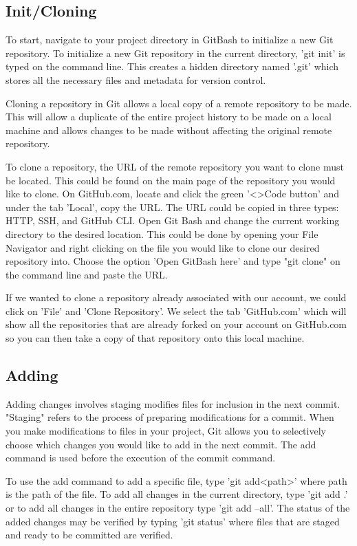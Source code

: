 \documentclass[10pt,twocolumn]{article}
\begin{document}
\subsection{Init/Cloning}

To start, navigate to your project directory in GitBash to initialize a new Git repository. To initialize a new Git repository in the current directory, 'git init' is typed on the command line. This creates a hidden directory named '.git' which stores all the necessary files and metadata for version control.  

Cloning a repository in Git allows a local copy of a remote repository to be made. This will allow a duplicate of the entire project history to be made on a local machine and allows changes to be made without affecting the original remote repository. 

To clone a repository, the URL of the remote repository you want to clone must be located. This could be found on the main page of the repository you would like to clone. On GitHub.com, locate and click the green '<>Code button' and under the tab 'Local', copy the URL. The URL could be copied in three types: HTTP, SSH, and GitHub CLI.  Open Git Bash and change the current working directory to the desired location. This could be done by opening your File Navigator and right clicking on the file you would like to clone our desired repository into. Choose the option 'Open GitBash here' and type "git clone" on the command line and paste the URL. 

If we wanted to clone a repository already associated with our account, we could click on 'File' and 'Clone Repository'. We select the tab 'GitHub.com' which will show all the repositories that are already forked on your account on GitHub.com so you can then take a copy of that repository onto this local machine.


\subsection{Adding}
Adding changes involves staging modifies files for inclusion in the next commit. "Staging" refers to the process of preparing modifications for a commit. When you make modifications to files in your project, Git allows you to selectively choose which changes you would like to add in the next commit. The add command is used before the execution of the commit command. 

To use the add command to add a specific file, type 'git add<path>' where path is the path of the file. To add all changes in the current directory, type 'git add .' or to add all changes in the entire repository type 
'git add --all'. The status of the added changes may be verified by typing 'git status' where files that are staged and ready to be committed are verified. 
\end{document}
